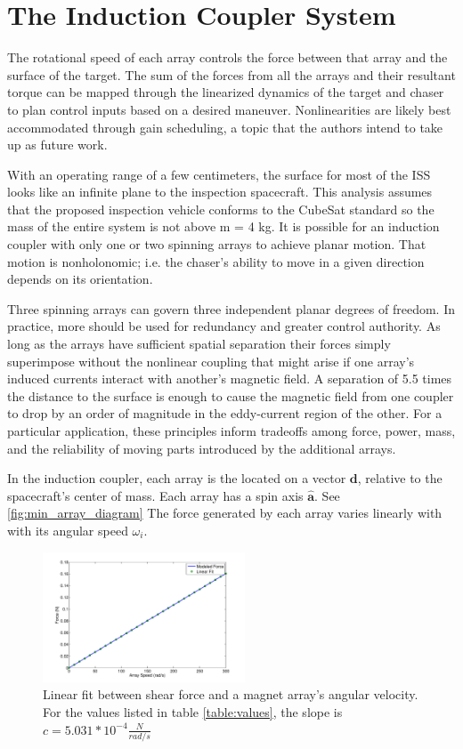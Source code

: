 \section{The Induction Coupler System}
\label{sec:system}

The rotational speed of each array controls the force between that array and the surface of the target. The sum of the forces from all the arrays and their resultant torque can be mapped through the linearized dynamics of the target and chaser to plan control inputs based on a desired maneuver. Nonlinearities are likely best accommodated through gain scheduling, a topic that the authors intend to take up as future work.

With an operating range of a few centimeters, the surface for most of the ISS looks like an infinite plane to the inspection spacecraft. This analysis assumes that the proposed inspection vehicle conforms to the CubeSat standard so the mass of the entire system is not above m = 4 kg.
It is possible for an induction coupler with only one or two spinning arrays to achieve planar motion. That motion is nonholonomic; i.e. the chaser's ability to move in a given direction depends on its orientation.

Three spinning arrays can govern three independent planar degrees of freedom. In practice, more should be used for redundancy and greater control authority. As long as the arrays have sufficient spatial separation their forces simply superimpose without the nonlinear coupling that might arise if one array's induced currents interact with another's magnetic field. A separation of 5.5 times the distance to the surface is enough to cause the magnetic field from one coupler to drop by an order of magnitude in the eddy-current region of the other. For a particular application, these principles inform tradeoffs among force, power, mass, and the reliability of moving parts introduced by the additional arrays.

In the induction coupler, each array is the located on a vector $\boldsymbol{d}$, relative to the spacecraft's center of mass. Each array has a spin axis $\hat{\boldsymbol{a}}$. See \ref{fig:min_array_diagram} The force generated by each array varies linearly with with its angular speed $\omega_i$.

\begin{figure}

\includegraphics[width = 6cm]{figures/lin_fit.pdf}
\caption{Linear fit between shear force and a magnet array's angular velocity. For the values listed in table \ref{table:values}, the slope is $c = 5.031 * 10^{-4} \frac{N}{rad/s}$}
\label{fig:lin_fit}
\end{figure}


